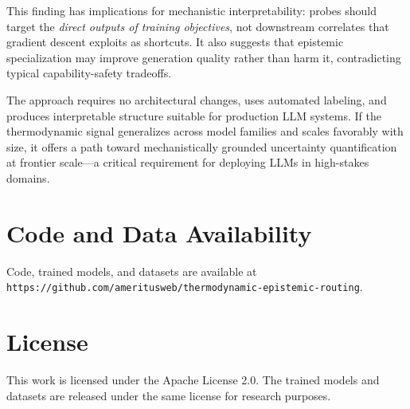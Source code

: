 \documentclass[11pt,a4paper]{article}
\begin{document}
This finding has implications for mechanistic interpretability: probes should target the \emph{direct outputs of training objectives}, not downstream correlates that gradient descent exploits as shortcuts. It also suggests that epistemic specialization may improve generation quality rather than harm it, contradicting typical capability-safety tradeoffs.

The approach requires no architectural changes, uses automated labeling, and produces interpretable structure suitable for production LLM systems. If the thermodynamic signal generalizes across model families and scales favorably with size, it offers a path toward mechanistically grounded uncertainty quantification at frontier scale---a critical requirement for deploying LLMs in high-stakes domains.

\section*{Code and Data Availability}

Code, trained models, and datasets are available at \texttt{https://github.com/ameritusweb/thermodynamic-epistemic-routing}.

\section*{License}

This work is licensed under the Apache License 2.0. The trained models and datasets are released under the same license for research purposes.
\end{document}
